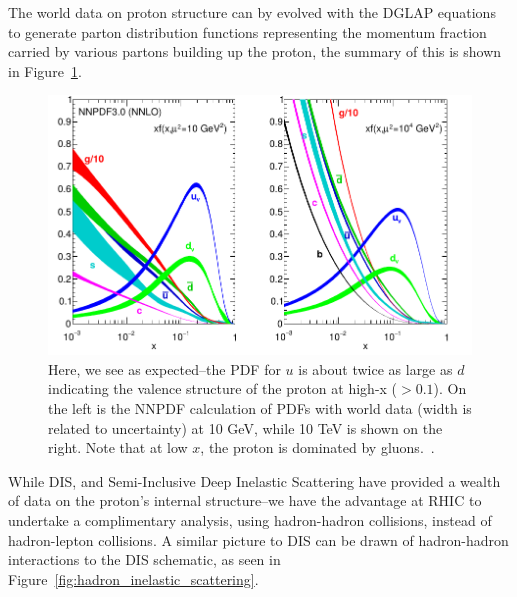 The world data on proton structure can by evolved with the DGLAP
equations~\cite{Ellis1974} to generate parton distribution functions
representing the momentum fraction carried by various partons building up the
proton, the summary of this is shown in Figure~\ref{fig:unpolarized_pdf}.

\begin{figure}[ht]
  \centering
  \includegraphics[width=0.7\linewidth]{./figures/unpolarized_pdfs.pdf}
  \caption{
    Here, we see as expected--the PDF for $u$ is about twice as large as $d$
    indicating the valence structure of the proton at high-x ($>0.1$). On the
    left is the NNPDF calculation of PDFs with world data (width is related to
    uncertainty) at 10 GeV, while 10 TeV is shown on the right. Note that at
    low $x$, the proton is dominated by gluons.~\cite{ReviewEidelman2012}.
  } 
  \label{fig:unpolarized_pdf}
\end{figure}

While DIS, and Semi-Inclusive Deep Inelastic Scattering have provided a wealth
of data on the proton's internal structure--we have the advantage at RHIC to
undertake a complimentary analysis, using hadron-hadron collisions, instead of
hadron-lepton collisions. A similar picture to DIS can be drawn of
hadron-hadron interactions to the DIS schematic, as seen in
Figure~\ref{fig:hadron_inelastic_scattering}.

